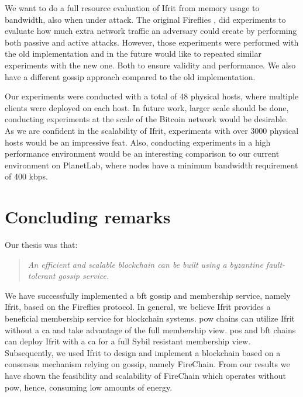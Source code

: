 \documentclass[USenglish]{uit-thesis}
\begin{document}
We want to do a full resource evaluation of Ifrit from memory usage to bandwidth, also when under attack.
The original Fireflies \cite{flies}, did experiments to evaluate how much extra network traffic an adversary could create by performing both passive and active attacks.
However, those experiments were performed with the old implementation and in the future would like to repeated similar experiments with the new one.
Both to ensure validity and performance.
We also have a different gossip approach compared to the old implementation. 

Our experiments were conducted with a total of 48 physical hosts, where multiple clients were deployed on each host.  
In future work, larger scale should be done, conducting experiments at the scale of the Bitcoin network would be desirable.
As we are confident in the scalability of Ifrit, experiments with over 3000 physical hosts would be an impressive feat.
Also, conducting experiments in a high performance environment would be an interesting comparison to our current environment on PlanetLab, where nodes have a minimum bandwidth requirement of 400 \gls{kbps}.   
  
  
\section{Concluding remarks}
Our thesis was that:
\begin{quote}
	\textit{An efficient and scalable blockchain can be built using a byzantine fault-tolerant gossip service.}
\end{quote}
We have successfully implemented a \gls{bft} gossip and membership service, namely Ifrit, based on the Fireflies protocol. 
In general, we believe Ifrit provides a beneficial membership service for blockchain systems.
\gls{pow} chains can utilize Ifrit without a \gls{ca} and take advantage of the full membership view.
\gls{pos} and \gls{bft} chains can deploy Ifrit with a \gls{ca} for a full Sybil resistant membership view.
Subsequently, we used Ifrit to design and implement a blockchain based on a consensus mechanism relying on gossip, namely FireChain.
From our results we have shown the feasibility and scalability of FireChain which operates without \gls{pow}, hence, consuming low amounts of energy.



\iffalse
We have succesfully implemented, tested and evaluated a proof-of-concept blockchain based on the protocol \cite{vanblock}, with Fireflies as its underlying network substrate.
Our design revolves around using gossip as a blockchain's consensus mechanism. 
From our results we show the feasibility of using Fireflies as a membership and gossip service in a blockchain context.
Finally, the protocol \cite{vanblock} has shown to be feasible in a highly distributed environment as a blockchain consensus mechanism.
\fi
 










\backmatter
\end{document}
